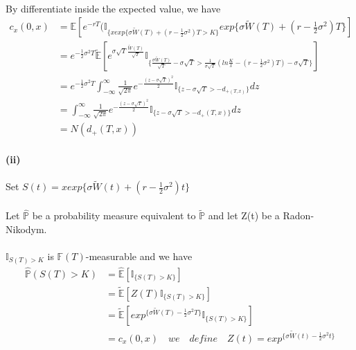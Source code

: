 \documentclass{article}
\begin{document}
\paragraph{}{By differentiate inside the expected value, we have}
\begin{align*}
  c_{x}(0,x) &= \mathbb{E}[e^{-rT}(\mathbb{I}_{\{x exp\{\sigma\tilde{W}(T)+(r-\frac{1}{2}\sigma^2)T>K\}} exp\{\sigma\tilde{W}(T)+(r-\frac{1}{2}\sigma^2)T\} ]\\
  &=e^{-\frac{1}{2}\sigma^{2}T}\tilde{\mathbb{E}}[e^{\sigma\sqrt{T}\frac{\tilde{W}(T)}{\sqrt{T}}}
  \mathbb{I}_{\{\frac{\sigma\tilde{W}(T)}{\sqrt{T}}-\sigma\sqrt{T}>
  \frac{1}{\sigma\sqrt{T}}(ln\frac{K}{x}-(r-\frac{1}{2}\sigma^2)T)-\sigma\sqrt{T}\}} ]\\
  &=e^{-\frac{1}{2}\sigma^{2}T}\int_{-\infty}^{\infty}\frac{1}{\sqrt{2\pi}}e^{-\frac{(z-\sigma\sqrt{T})^2}{2}}
  \mathbb{I}_{\{z-\sigma\sqrt{T}>-d_{+(T,x)}\}}dz\\
&=\int_{-\infty}^{\infty}\frac{1}{\sqrt{2\pi}}e^{-\frac{(z-\sigma\sqrt{T})^2}{2}}
  \mathbb{I}_{\{z-\sigma\sqrt{T}>-d_+(T,x)\}}dz\\
  &=N(d_+(T,x))
\end{align*}
\clearpage
\paragraph{(ii)}{}
\paragraph{}{Set $S(t)=xexp\{\sigma\tilde{W}(t)+(r-\frac{1}{2}\sigma^2)t\}$}
\paragraph{}{Let $\hat{\mathbb{P}}$ be a probability measure equivalent to $\tilde{\mathbb{P}}$ and let Z(t) be a Radon-Nikodym. }
\paragraph{}{$\mathbb{I}_{S(T)>K}$ is $\mathbb{F}(T)$-measurable and we have}
\begin{align*}
  \hat{\mathbb{P}}(S(T)>K) & =\hat{\mathbb{E}}[\mathbb{I}_{\{S(T)>K\}}] \\
   & =\tilde{\mathbb{E}}[Z(T)\mathbb{I}_{\{S(T)>K\}}] \\
   &  =\tilde{\mathbb{E}}[exp^{\{\sigma\tilde{W}(T)-\frac{1}{2}\sigma^{2}T\}}\mathbb{I}_{\{S(T)>K\}}] \\
   & =c_{x}(0,x)\quad we\quad define \quad Z(t)=exp^{\{\sigma\tilde{W}(t)-\frac{1}{2}\sigma^{2}t\}}
\end{align*}
\end{document}
